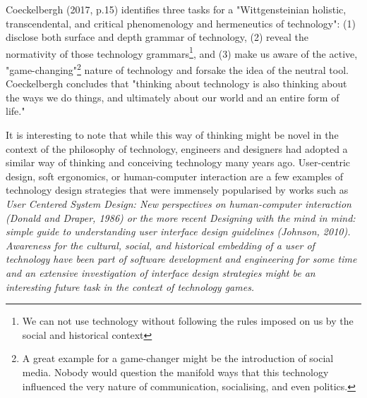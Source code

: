 Coeckelbergh (2017, p.15) identifies three tasks for a "Wittgensteinian holistic, transcendental, and critical phenomenology and hermeneutics of technology": (1) disclose both surface and depth grammar of technology, (2) reveal the normativity of those technology grammars\footnote{We can not use technology without following the rules imposed on us by the social and historical context}, and (3) make us aware of the active, "game-changing"\footnote{A great example for a game-changer might be the introduction of social media. Nobody would question the manifold ways that this technology influenced the very nature of communication, socialising, and even politics.} nature of technology and forsake the idea of the neutral tool. Coeckelbergh concludes that "thinking about technology is also thinking about the
ways we do things, and ultimately about our world and an entire form of life."

It is interesting to note that while this way of thinking might be novel in the context of the philosophy of technology, engineers and designers had adopted a similar way of thinking and conceiving technology many years ago. User-centric design, soft ergonomics, or human-computer interaction are a few examples of technology design
strategies that were immensely popularised by works such as \em{User Centered System Design: New perspectives on human-computer interaction} (Donald and Draper, 1986) or the more recent Designing with the mind in mind: simple guide to understanding user interface design guidelines (Johnson, 2010). Awareness for the cultural, social, and historical embedding of a user of technology have been part of software development and engineering for some time and an extensive investigation of interface design strategies might be an interesting future task in the context of technology games.